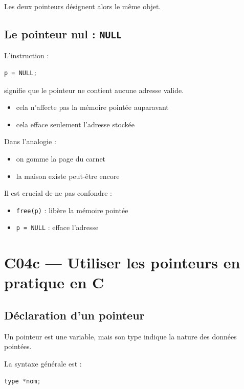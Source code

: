 Les deux pointeurs désignent alors le même objet.

\subsection{Le pointeur nul : \texttt{NULL}}

L’instruction :

\begin{lstlisting}[language=C]
p = NULL;
\end{lstlisting}

signifie que le pointeur ne contient aucune adresse valide.

\begin{itemize}
    \item cela n’affecte pas la mémoire pointée auparavant
    \item cela efface seulement l’adresse stockée
\end{itemize}

Dans l’analogie :

\begin{itemize}
    \item on gomme la page du carnet
    \item la maison existe peut-être encore
\end{itemize}

Il est crucial de ne pas confondre :

\begin{itemize}
    \item \texttt{free(p)} : libère la mémoire pointée
    \item \texttt{p = NULL} : efface l’adresse
\end{itemize}

\section{C04c — Utiliser les pointeurs en pratique en C}

\subsection{Déclaration d’un pointeur}

Un pointeur est une variable, mais son type indique
la nature des données pointées.

La syntaxe générale est :

\begin{lstlisting}[language=C]
type *nom;
\end{lstlisting}

